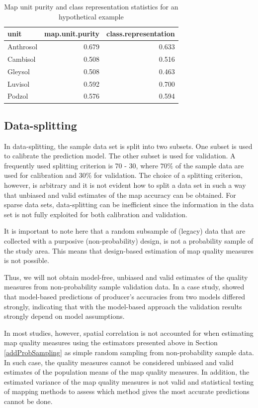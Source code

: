 \documentclass[10pt,b5paper,]{book}
\theoremstyle{definition}
\theoremstyle{definition}
\theoremstyle{definition}
\theoremstyle{remark}
\begin{document}
\begin{table}

\caption{\label{tab:purity}Map unit purity and class representation statistics for an hypothetical example}
\centering
\begin{tabular}[t]{lrr}
\toprule
unit & map.unit.purity & class.representation\\
\midrule
Anthrosol & 0.679 & 0.633\\
Cambisol & 0.508 & 0.516\\
Gleysol & 0.508 & 0.463\\
Luvisol & 0.592 & 0.700\\
Podzol & 0.576 & 0.594\\
\bottomrule
\end{tabular}
\end{table}

\hypertarget{data-splitting}{%
\subsection{Data-splitting}\label{data-splitting}}

In data-splitting, the sample data set is split into two subsets. One
subset is used to calibrate the prediction model. The other subset is
used for validation. A frequently used splitting criterion is 70 - 30,
where \(70\%\) of the sample data are used for calibration and \(30\%\)
for validation. The choice of a splitting criterion, however, is
arbitrary and it is not evident how to split a data set in such a way
that unbiased and valid estimates of the map accuracy can be obtained.
For sparse data sets, data-splitting can be inefficient since the
information in the data set is not fully exploited for both calibration
and validation.

It is important to note here that a random subsample of (legacy) data
that are collected with a purposive (non-probability) design, is not a
probability sample of the study area. This means that design-based
estimation of map quality measures is not possible.

Thus, we will not obtain model-free, unbiased and valid estimates of the
quality measures from non-probability sample validation data. In a case
study, \citet{knotters2013purposive} showed that model-based predictions
of producer's accuracies from two models differed strongly, indicating
that with the model-based approach the validation results strongly
depend on model assumptions.

In most studies, however, spatial correlation is not accounted for when
estimating map quality measures using the estimators presented above in
Section \ref{addProbSampling} as simple random sampling from
non-probability sample data. In such case, the quality measures cannot
be considered unbiased and valid estimates of the population means of
the map quality measures. In addition, the estimated variance of the map
quality measures is not valid and statistical testing of mapping methods
to assess which method gives the most accurate predictions cannot be
done.
\end{document}
